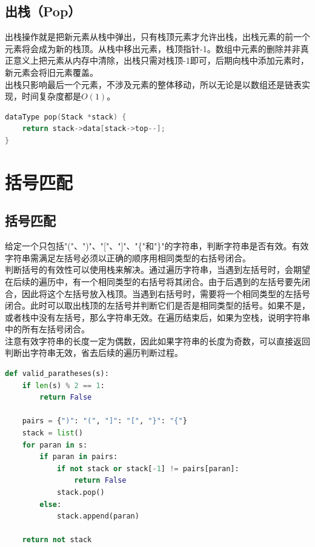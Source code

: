 \vspace{0.5cm}

\subsection{出栈（Pop）}

出栈操作就是把新元素从栈中弹出，只有栈顶元素才允许出栈，出栈元素的前一个元素将会成为新的栈顶。从栈中移出元素，栈顶指针-1。数组中元素的删除并非真正意义上把元素从内存中清除，出栈只需对栈顶-1即可，后期向栈中添加元素时，新元素会将旧元素覆盖。\\

出栈只影响最后一个元素，不涉及元素的整体移动，所以无论是以数组还是链表实现，时间复杂度都是$ O(1) $。\\


\begin{lstlisting}[language=C]
dataType pop(Stack *stack) {
    return stack->data[stack->top--];
}
\end{lstlisting}

\newpage

\section{括号匹配}

\subsection{括号匹配}

给定一个只包括"("、")"、"["、"]"、"\{"和"\}"的字符串，判断字符串是否有效。有效字符串需满足左括号必须以正确的顺序用相同类型的右括号闭合。\\

判断括号的有效性可以使用栈来解决。通过遍历字符串，当遇到左括号时，会期望在后续的遍历中，有一个相同类型的右括号将其闭合。由于后遇到的左括号要先闭合，因此将这个左括号放入栈顶。当遇到右括号时，需要将一个相同类型的左括号闭合。此时可以取出栈顶的左括号并判断它们是否是相同类型的括号。如果不是，或者栈中没有左括号，那么字符串无效。在遍历结束后，如果为空栈，说明字符串中的所有左括号闭合。\\

注意有效字符串的长度一定为偶数，因此如果字符串的长度为奇数，可以直接返回判断出字符串无效，省去后续的遍历判断过程。\\


\begin{lstlisting}[language=Python]
def valid_paratheses(s):
    if len(s) % 2 == 1:
        return False
    
    pairs = {")": "(", "]": "[", "}": "{"}
    stack = list()
    for paran in s:
        if paran in pairs:
            if not stack or stack[-1] != pairs[paran]:
                return False
            stack.pop()
        else:
            stack.append(paran)

    return not stack
\end{lstlisting}

